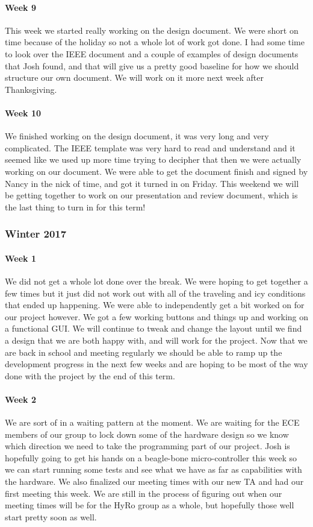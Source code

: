\documentclass[10pt,draftclsnofoot,onecolumn,retainorgcmds]{IEEEtran}
\begin{document}
\paragraph{Week 9}
This week we started really working on the design document. We were short on time because of the holiday so not a whole lot of work got done. I had some time to look over the IEEE document and a couple of examples of design documents that Josh found, and that will give us a pretty good baseline for how we should structure our own document. We will work on it more next week after Thanksgiving.\\
\paragraph{Week 10}
We finished working on the design document, it was very long and very complicated. The IEEE template was very hard to read and understand and it seemed like we used up more time trying to decipher that then we were actually working on our document. We were able to get the document finish and signed by Nancy in the nick of time, and got it turned in on Friday. This weekend we will be getting together to work on our presentation and review document, which is the last thing to turn in for this term!\\
\subsubsection{Winter 2017}
\paragraph{Week 1}
We did not get a whole lot done over the break. We were hoping to get together a few times but it just did not work out with all of the traveling and icy conditions that ended up happening. We were able to independently get a bit worked on for our project however. We got a few working buttons and things up and working on a functional GUI. We will continue to tweak and change the layout until we find a design that we are both happy with, and will work for the project. Now that we are back in school and meeting regularly we should be able to ramp up the development progress in the next few weeks and are hoping to be most of the way done with the project by the end of this term.\\
\paragraph{Week 2}
We are sort of in a waiting pattern at the moment. We are waiting for the ECE members of our group to lock down some of the hardware design so we know which direction we need to take the programming part of our project. Josh is hopefully going to get his hands on a beagle-bone micro-controller this week so we can start running some tests and see what we have as far as capabilities with the hardware. We also finalized our meeting times with our new TA and had our first meeting this week. We are still in the process of figuring out when our meeting times will be for the HyRo group as a whole, but hopefully those well start pretty soon as well.\\
\end{document}
